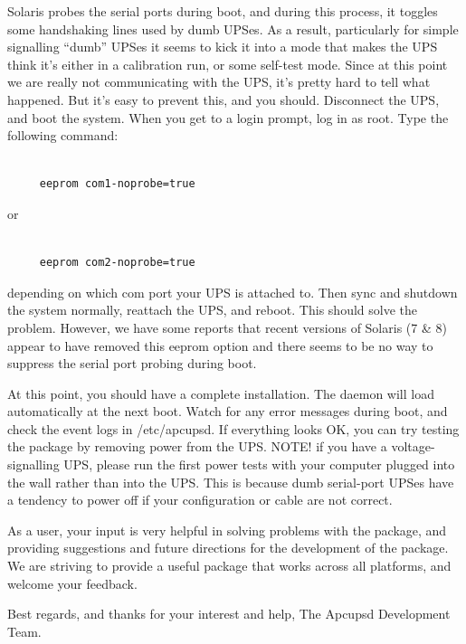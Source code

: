 Solaris probes the serial ports during boot, and during this process, it
toggles some handshaking lines used by dumb UPSes. As a result, particularly
for simple signalling ``dumb'' UPSes it seems to kick it into a mode that
makes the UPS think it's either in a calibration run, or some self-test mode.
Since at this point we are really not communicating with the UPS, it's pretty
hard to tell what happened. But it's easy to prevent this, and you should.
Disconnect the UPS, and boot the system. When you get to a login prompt, log
in as root. Type the following command: 

\footnotesize
\begin{verbatim}
     
     eeprom com1-noprobe=true
\end{verbatim}
\normalsize

or 

\footnotesize
\begin{verbatim}
     
     eeprom com2-noprobe=true
\end{verbatim}
\normalsize

depending on which com port your UPS is attached to. Then sync and shutdown
the system normally, reattach the UPS, and reboot. This should solve the
problem. However, we have some reports that recent versions of Solaris (7 \&
8) appear to have removed this eeprom option and there seems to be no way to
suppress the serial port probing during boot.  

At this point, you should have a complete installation. The daemon will load
automatically at the next boot. Watch for any error messages during boot, and
check the event logs in /etc/apcupsd. If everything looks OK, you can try
testing the package by removing power from the UPS. NOTE! if you have a
voltage-signalling UPS, please run the first power tests with your computer
plugged into the wall rather than into the UPS. This is because dumb
serial-port UPSes have a tendency to power off if your configuration or cable
are not correct.  

As a user, your input is very helpful in solving problems with the package,
and providing suggestions and future directions for the development of the
package. We are striving to provide a useful package that works across all
platforms, and welcome your feedback.  

Best regards, and thanks for your interest and help, The Apcupsd Development
Team. 

\label{Unknown-System}

